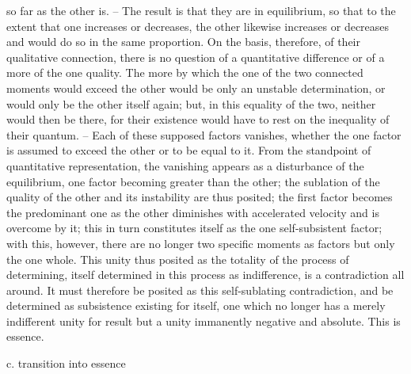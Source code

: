 so far as the other is. – The result is that they are in equilibrium, so that to
the extent that one increases or decreases, the other likewise increases or
decreases and would do so in the same proportion.
On the basis, therefore, of their qualitative connection, there is no
question of a quantitative difference or of a more of the one quality. The
more by which the one of the two connected moments would exceed the
other would be only an unstable determination, or would only be the other
itself again; but, in this equality of the two, neither would then be there,
for their existence would have to rest on the inequality of their quantum. –
Each of these supposed factors vanishes, whether the one factor is assumed
to exceed the other or to be equal to it. From the standpoint of quantitative
representation, the vanishing appears as a disturbance of the equilibrium,
one factor becoming greater than the other; the sublation of the quality
of the other and its instability are thus posited; the first factor becomes
the predominant one as the other diminishes with accelerated velocity and
is overcome by it; this in turn constitutes itself as the one self-subsistent
factor; with this, however, there are no longer two specific moments as
factors but only the one whole.
This unity thus posited as the totality of the process of determining, itself
determined in this process as indifference, is a contradiction all around.
It must therefore be posited as this self-sublating contradiction, and be
determined as subsistence existing for itself, one which no longer has a
merely indifferent unity for result but a unity immanently negative and
absolute. This is essence.

c. transition into essence

